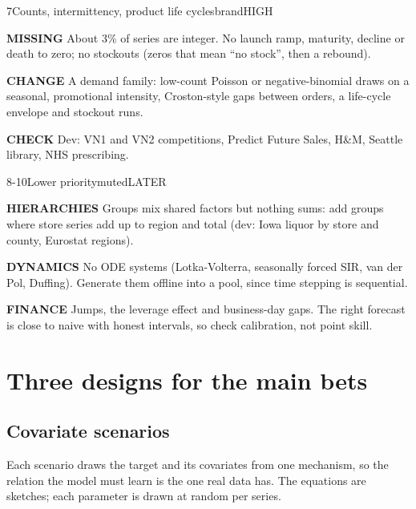 \documentclass[10pt,a4paper]{article}
\newcommand{\row}[1]{\par\smallskip\textcolor{brandd}{\small\bfseries\MakeUppercase{#1}}\enspace}
\begin{document}
\begin{gapcard}{7}{Counts, intermittency, product life cycles}{brand}{HIGH}
\row{Missing} About 3\% of series are integer. No launch ramp, maturity, decline or death to zero; no stockouts (zeros that mean ``no stock'', then a rebound).
\row{Change} A demand family: low-count Poisson or negative-binomial draws on a seasonal, promotional intensity, Croston-style gaps between orders, a life-cycle envelope and stockout runs.
\row{Check} Dev: VN1 and VN2 competitions, Predict Future Sales, H\&M, Seattle library, NHS prescribing.
\end{gapcard}

\begin{gapcard}{8-10}{Lower priority}{muted}{LATER}
\row{Hierarchies} Groups mix shared factors but nothing sums: add groups where store series add up to region and total (dev: Iowa liquor by store and county, Eurostat regions).
\row{Dynamics} No ODE systems (Lotka-Volterra, seasonally forced SIR, van der Pol, Duffing). Generate them offline into a pool, since time stepping is sequential.
\row{Finance} Jumps, the leverage effect and business-day gaps. The right forecast is close to naive with honest intervals, so check calibration, not point skill.
\end{gapcard}

\newpage
\section{Three designs for the main bets}\label{sec:designs}

\subsection{Covariate scenarios}

Each scenario draws the target and its covariates from one mechanism, so the relation the model must learn is the one real data has. The equations are sketches; each parameter is drawn at random per series.
\end{document}
